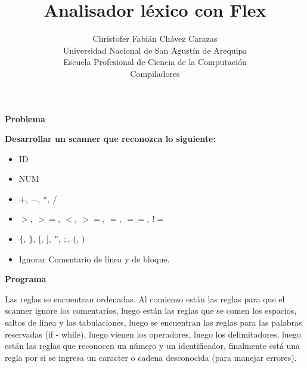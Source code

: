 \documentclass[a4paper,12pt]{article}
\begin{document}
\title{Analisador léxico con Flex}
\author{
Christofer Fabián Chávez Carazas \\
\small{Universidad Nacional de San Agustín de Arequipa} \\
\small{Escuela Profesional de Ciencia de la Computación} \\
\small{Compiladores}
}
\date{}

\maketitle

\begin{large}
 \textbf{Problema}
\end{large}
\textbf{Desarrollar un scanner que reconozca lo siguiente:}

\begin{itemize}
 \item ID
 \item NUM
 \item $+,\:-,\:*,\:/$
 \item $>,\:>=,\:<,\:>=,\:=,\:==,\:!=$
 \item $\{,\:\},\:[,\:],\:",\:;,\:(,\:)$
 \item Ignorar Comentario de línea y de bloque.
\end{itemize}

\begin{large}
 \textbf{Programa}
\end{large}

Las reglas se encuentran ordenadas. Al comienzo están las reglas para que el scanner ignore los comentarios, luego están las reglas que se comen los espacios, saltos de
línea y las tabulaciones, luego se encuentran las reglas para las palabras reservadas (if - while), luego vienen los operadores, luego los delimitadores, luego están las
reglas que reconocen un número y un identificador, finalmente está una regla por si se ingresa un caracter o cadena desconocida (para manejar errores).
\end{document}
